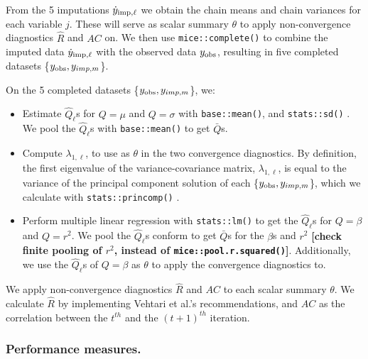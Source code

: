 \documentclass[Royal,times,sageh]{sagej}
\begin{document}
From the 5 imputations \(\dot y_{\rm imp, \ell}\) we obtain the chain means and chain variances for each variable \(j\). These will serve as scalar summary \(\theta\) to apply non-convergence diagnostics \(\widehat{R}\) and \(AC\) on. We then use \texttt{mice::complete()} to combine the imputed data \(\dot y_{\rm imp, \ell}\) with the observed data \(y_{\rm obs}\), resulting in five completed datasets \{\(y_{\rm obs}, y_{imp, m}\)\}.

On the 5 completed datasets \{\(y_{\rm obs}, y_{imp, m}\)\}, we:

\begin{itemize}
\item
  Estimate \(\hat{Q}_\ell\)s for \(Q= \mu\) and \(Q=\sigma\) with \texttt{base::mean()}, and \texttt{stats::sd()} \citep{R}. We pool the \(\hat{Q}_\ell\)s with \texttt{base::mean()} to get \(\bar{Q}\)s.
\item
  Compute \(\lambda_{1, \ell}\), to use as \(\theta\) in the two convergence diagnostics. By definition, the first eigenvalue of the variance-covariance matrix, \(\lambda_{1, \ell}\), is equal to the variance of the principal component solution of each \{\(y_{\rm obs}, y_{imp, m}\)\}, which we calculate with \texttt{stats::princomp()} \citep{R}.
\item
  Perform multiple linear regression with \texttt{stats::lm()} \citep{R} to get the \(\hat{Q}_\ell\)s for \(Q=\beta\) and \(Q=r^2\). We pool the \(\hat{Q}_\ell\)s conform \citet{vink14} to get \(\bar{Q}\)s for the \(\beta\)s and \(r^2\) \textbf{{[}check finite pooling of \(r^2\), instead of \texttt{mice::pool.r.squared()}{]}}. Additionally, we use the \(\hat{Q}_\ell\)s of \(Q=\beta\) as \(\theta\) to apply the convergence diagnostics to.
\end{itemize}

We apply non-convergence diagnostics \(\widehat{R}\) and \(AC\) to each scalar summary \(\theta\). We calculate \(\widehat{R}\) by implementing Vehtari et al.'s \citeyearpar{veht19} recommendations, and \(AC\) as the correlation between the \(t^{th}\) and the \((t+1)^{th}\) iteration.

\hypertarget{performance-measures.}{%
\subsubsection{Performance measures.}\label{performance-measures.}}
\end{document}
